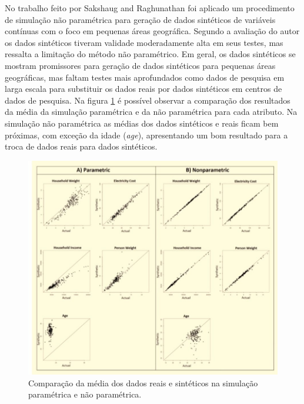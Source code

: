 \documentclass[
	12pt,				%
	openright,			%
	twoside,			%
	a4paper,			%
	english,			%
	brazil				%
	]{abntex2}
\begin{document}
		No trabalho feito por Sakshaug and Raghunathan \cite{Sakshaug2014} foi aplicado um procedimento de simulação não paramétrica para geração de dados sintéticos de variáveis contínuas com o foco em pequenas áreas geográfica. 
		Segundo a avaliação do autor os dados sintéticos tiveram validade moderadamente alta em seus testes, mas ressalta a limitação do método não paramétrico. 
		Em geral, os dados sintéticos se mostram promissores para geração de dados sintéticos para pequenas áreas geográficas, mas faltam testes mais aprofundados como dados de pesquisa em larga escala para substituir os dados reais por dados sintéticos em centros de dados de pesquisa.
		Na figura \ref{fig:SakshaugandRaghunathan} é possível observar a comparação dos resultados da média da simulação paramétrica e da não paramétrica para cada atributo.
		Na simulação não paramétrica as médias dos dados sintéticos e reais ficam bem próximas, com exceção da idade (\emph{age}), apresentando um bom resultado para a troca de dados reais para dados sintéticos.
		\begin{figure}[h!]
			\centering
			\includegraphics[width=\linewidth]{./figures/TrabalhosRelacionados/SakshaugandRaghunathan.jpg}
			\caption{Comparação da média dos dados reais e sintéticos na simulação paramétrica e não paramétrica.}
			\label{fig:SakshaugandRaghunathan}
		\end{figure}
\end{document}
